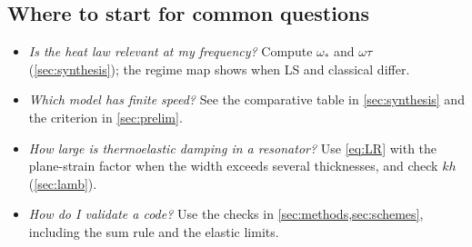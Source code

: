 \subsection{Where to start for common questions}
\begin{itemize}
\item \emph{Is the heat law relevant at my frequency?} Compute $\omega_*$ and $\omega\tau$ (\cref{sec:synthesis}); the regime map shows when LS and classical differ.
\item \emph{Which model has finite speed?} See the comparative table in \cref{sec:synthesis} and the criterion in \cref{sec:prelim}.
\item \emph{How large is thermoelastic damping in a resonator?} Use \cref{eq:LR} with the plane-strain factor when the width exceeds several thicknesses, and check $kh$ (\cref{sec:lamb}).
\item \emph{How do I validate a code?} Use the checks in \cref{sec:methods,sec:schemes}, including the sum rule and the elastic limits.
\end{itemize}

